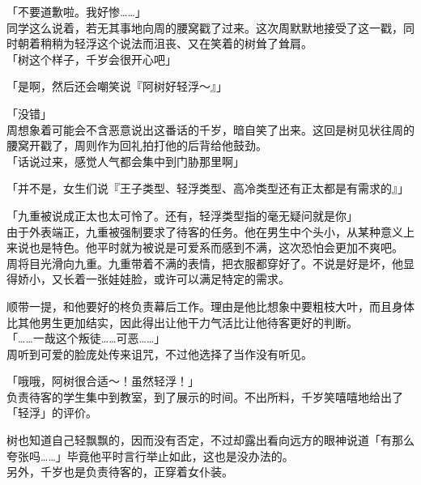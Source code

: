 「不要道歉啦。我好惨……」\\

同学这么说着，若无其事地向周的腰窝戳了过来。这次周默默地接受了这一戳，同时朝着稍稍为轻浮这个说法而沮丧、又在笑着的树耸了耸肩。\\

「树这个样子，千岁会很开心吧」

「是啊，然后还会嘲笑说『阿树好轻浮～』」

「没错」\\

周想象着可能会不含恶意说出这番话的千岁，暗自笑了出来。这回是树见状往周的腰窝开戳了，周则作为回礼拍打他的后背给他鼓劲。\\

「话说过来，感觉人气都会集中到门胁那里啊」

「并不是，女生们说『王子类型、轻浮类型、高冷类型还有正太都是有需求的』」

「九重被说成正太也太可怜了。还有，轻浮类型指的毫无疑问就是你」\\

由于外表端正，九重被强制要求了待客的任务。他在男生中个头小，从某种意义上来说也是特色。他平时就为被说是可爱系而感到不满，这次恐怕会更加不爽吧。\\

周将目光滑向九重。九重带着不满的表情，把衣服都穿好了。不说是好是坏，他显得娇小，又长着一张娃娃脸，或许可以满足特定的需求。

顺带一提，和他要好的柊负责幕后工作。理由是他比想象中要粗枝大叶，而且身体比其他男生更加结实，因此得出让他干力气活比让他待客更好的判断。\\

「……一哉这个叛徒……可恶……」\\

周听到可爱的脸庞处传来诅咒，不过他选择了当作没有听见。\\

\vspace{2\baselineskip}

「哦哦，阿树很合适～！虽然轻浮！」\\

负责待客的学生集中到教室，到了展示的时间。不出所料，千岁笑嘻嘻地给出了「轻浮」的评价。

树也知道自己轻飘飘的，因而没有否定，不过却露出看向远方的眼神说道「有那么夸张吗……」毕竟他平时言行举止如此，这也是没办法的。\\

另外，千岁也是负责待客的，正穿着女仆装。

